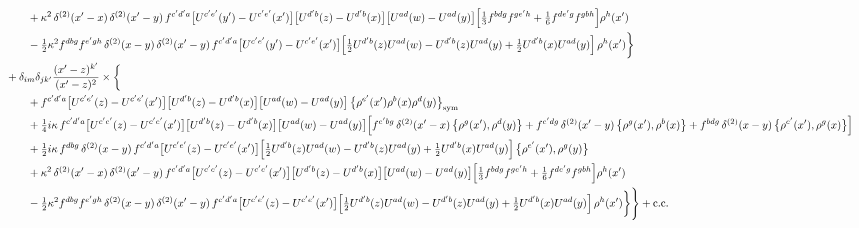 \documentclass[10pt]{article}
\numberwithin{equation}{section}
\begin{document}
\begin{align}
&\qquad\quad+\kappa^{2}\,\delta^{(2)}(x^{\prime}-x)\,\delta^{(2)}(x^{\prime}-y)\,f^{c^{\prime}d^{\prime}a}\big[U^{c^{\prime}e^{\prime}}(y^{\prime})-U^{c^{\prime}e^{\prime}}(x^{\prime})\big]\big[U^{d^{\prime}b}(z)-U^{d^{\prime}b}(x)\big]\big[U^{ad}(w)-U^{ad}(y)\big]\Big[\tfrac13f^{bdg}f^{ge^{\prime}h}+\tfrac16f^{de^{\prime}g}f^{gbh}\Big]\rho^{h}(x^{\prime})\notag\\
&\qquad\quad-\tfrac12\kappa^{2}f^{dbg}f^{e^{\prime}gh}\,\delta^{(2)}(x-y)\,\delta^{(2)}(x^{\prime}-y)\,f^{c^{\prime}d^{\prime}a}\big[U^{c^{\prime}e^{\prime}}(y^{\prime})-U^{c^{\prime}e^{\prime}}(x^{\prime})\big]\Big[\tfrac12U^{d^{\prime}b}(z)U^{ad}(w)-U^{d^{\prime}b}(z)U^{ad}(y)+\tfrac12U^{d^{\prime}b}(x)U^{ad}(y)\Big]\,\rho^{h}(x^{\prime})\bigg\}\notag\\
&\quad+\delta_{im}\delta_{jk^{\prime}}\frac{(x^{\prime}-z)^{k^{\prime}}}{(x^{\prime}-z)^{2}}\times\bigg\{\notag\\
&\qquad\quad+f^{c^{\prime}d^{\prime}a}\big[U^{c^{\prime}e^{\prime}}(z)-U^{c^{\prime}e^{\prime}}(x^{\prime})\big]\big[U^{d^{\prime}b}(z)-U^{d^{\prime}b}(x)\big]\big[U^{ad}(w)-U^{ad}(y)\big]\,\big\{\rho^{e^{\prime}}(x^{\prime})\rho^{b}(x)\rho^{d}(y)\big\}_{\rm sym}\notag\\
&\qquad\quad+\tfrac14 i\kappa\,f^{c^{\prime}d^{\prime}a}\big[U^{c^{\prime}e^{\prime}}(z)-U^{c^{\prime}e^{\prime}}(x^{\prime})\big]\big[U^{d^{\prime}b}(z)-U^{d^{\prime}b}(x)\big]\big[U^{ad}(w)-U^{ad}(y)\big]\Big[f^{e^{\prime}bg}\,\delta^{(2)}(x^{\prime}-x)\,\big\{\rho^{g}(x^{\prime}),\rho^{d}(y)\big\}+f^{e^{\prime}dg}\,\delta^{(2)}(x^{\prime}-y)\,\big\{\rho^{g}(x^{\prime}),\rho^{b}(x)\big\}+f^{bdg}\,\delta^{(2)}(x-y)\,\big\{\rho^{e^{\prime}}(x^{\prime}),\rho^{g}(x)\big\}\Big]\notag\\
&\qquad\quad+\tfrac12 i\kappa\,f^{dbg}\,\delta^{(2)}(x-y)\,f^{c^{\prime}d^{\prime}a}\big[U^{c^{\prime}e^{\prime}}(z)-U^{c^{\prime}e^{\prime}}(x^{\prime})\big]\Big[\tfrac12U^{d^{\prime}b}(z)U^{ad}(w)-U^{d^{\prime}b}(z)U^{ad}(y)+\tfrac12U^{d^{\prime}b}(x)U^{ad}(y)\Big]\,\big\{\rho^{e^{\prime}}(x^{\prime}),\rho^{g}(y)\big\}\notag\\
&\qquad\quad+\kappa^{2}\,\delta^{(2)}(x^{\prime}-x)\,\delta^{(2)}(x^{\prime}-y)\,f^{c^{\prime}d^{\prime}a}\big[U^{c^{\prime}e^{\prime}}(z)-U^{c^{\prime}e^{\prime}}(x^{\prime})\big]\big[U^{d^{\prime}b}(z)-U^{d^{\prime}b}(x)\big]\big[U^{ad}(w)-U^{ad}(y)\big]\Big[\tfrac13f^{bdg}f^{ge^{\prime}h}+\tfrac16f^{de^{\prime}g}f^{gbh}\Big]\rho^{h}(x^{\prime})\notag\\
&\qquad\quad-\tfrac12\kappa^{2}f^{dbg}f^{e^{\prime}gh}\,\delta^{(2)}(x-y)\,\delta^{(2)}(x^{\prime}-y)\,f^{c^{\prime}d^{\prime}a}\big[U^{c^{\prime}e^{\prime}}(z)-U^{c^{\prime}e^{\prime}}(x^{\prime})\big]\Big[\tfrac12U^{d^{\prime}b}(z)U^{ad}(w)-U^{d^{\prime}b}(z)U^{ad}(y)+\tfrac12U^{d^{\prime}b}(x)U^{ad}(y)\Big]\,\rho^{h}(x^{\prime})\bigg\}\Bigg\}+{\rm c.c.}
\end{align}
\newpage
\end{document}
